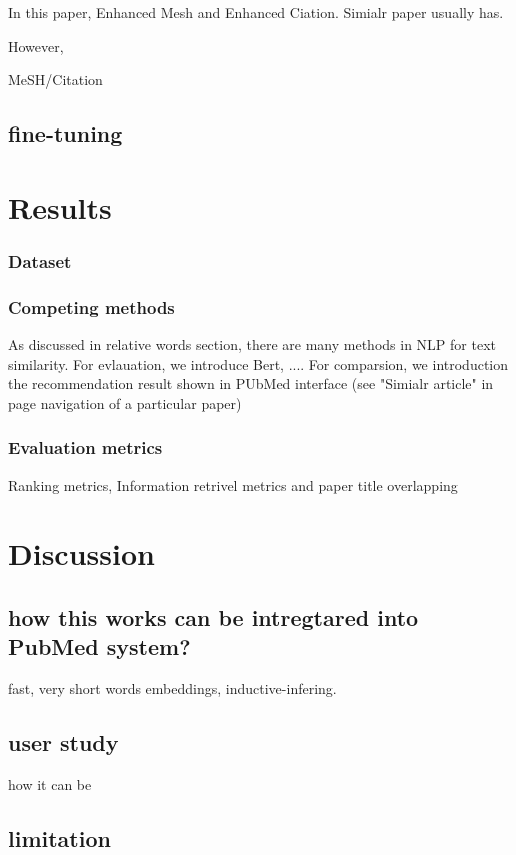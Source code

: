 \documentclass[11pt]{article}
\begin{document}
    In this paper,
    Enhanced Mesh and Enhanced Ciation. Simialr paper usually has.

    However,

    MeSH/Citation


    \subsection{fine-tuning}


    \section{Results}
    \subsubsection{Dataset}


    \subsubsection{Competing methods}
    As discussed in relative words section, there are many methods in NLP for text similarity. For evlauation, we introduce Bert, .... For comparsion, we introduction the recommendation result shown in PUbMed interface (see "Simialr article" in page navigation of a particular paper)
    \subsubsection{Evaluation metrics}
    Ranking metrics, Information retrivel metrics and paper title overlapping



    \section{Discussion}

    \subsection{how this works can be intregtared into PubMed system?}
    fast, very short words embeddings, inductive-infering.

    \subsection{user study}
    how it can be

    \subsection{limitation}
\end{document}
